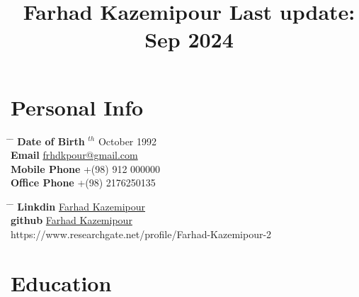 \documentclass[10pt]{article} %
\begin{document}

\title{Farhad Kazemipour  \hfill \small{Last update: Sep 2024}} %


\section{Personal Info}
\parbox{0.5\textwidth}{ %
\begin{tabbing} %
\hspace{3cm} \= \hspace{4cm} \= \kill %
{\bf Date of Birth} $^{th}$ October 1992 \\ %
{\bf Email} \> \href{mailto:frhdkpour@gmail.com}{frhdkpour@gmail.com} \\ %
{\bf Mobile Phone} \> +(98) 912 000000 \\ %
{\bf Office Phone} \> +(98) 2176250135 \\ %

\end{tabbing}}
\hfill %
\parbox{0.5\textwidth}{ %
\begin{tabbing} %
\hspace{3cm} \= \hspace{4cm} \= \kill %
{\bf Linkdin} \> \href{https://www.linkedin.com/in/farhad-kazemipour/}{Farhad Kazemipour} \\ %
{\bf github} \> \href{https://github.com/Faarhad}{Farhad Kazemipour} \\ %
https://www.researchgate.net/profile/Farhad-Kazemipour-2
\end{tabbing}}



\section{Education}
\end{document}
